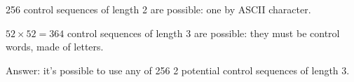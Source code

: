 256 control sequences of length 2 are possible: one by ASCII character.

$52 \times 52 = 364$ control sequences of length 3 are possible: they must be control words, made of letters.

Answer: it’s possible to use any of 256 2 potential control
sequences of length 3.
\bye

